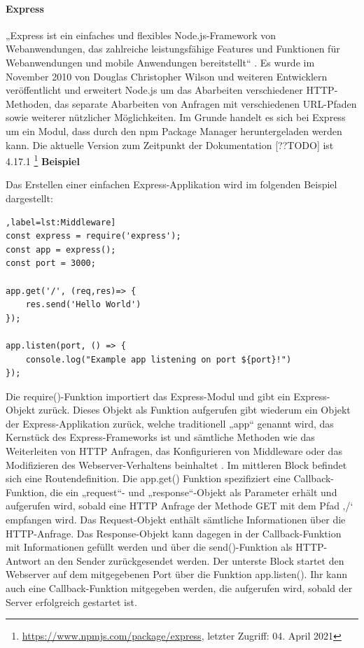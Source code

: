 \paragraph{Express}
„Express ist ein einfaches und flexibles Node.js-Framework von Webanwendungen, das zahlreiche leistungsfähige Features und Funktionen für Webanwendungen und mobile Anwendungen bereitstellt“ \cite{Node1.6}.  Es wurde im November 2010 von Douglas Christopher Wilson und weiteren Entwicklern veröffentlicht und erweitert Node.js um das Abarbeiten verschiedener HTTP-Methoden, das separate Abarbeiten von Anfragen mit verschiedenen URL-Pfaden sowie weiterer nützlicher Möglichkeiten. Im Grunde handelt es sich bei Express um ein Modul, dass durch den npm Package Manager heruntergeladen werden kann. Die aktuelle Version zum Zeitpunkt der Dokumentation [??TODO] ist 4.17.1 \footnote{\url{https://www.npmjs.com/package/express}, letzter Zugriff: 04. April 2021}
\newline
\newline
\textbf{Beispiel}
\newline

\noindent
Das Erstellen einer einfachen Express-Applikation wird im folgenden Beispiel dargestellt:\newline

\begin{lstlisting}[caption=Einfacher Webserver [nodejs 1.8],label=lst:Middleware]
const express = require('express');
const app = express();
const port = 3000;

app.get('/', (req,res)=> {
	res.send('Hello World')
});

app.listen(port, () => {
	console.log("Example app listening on port ${port}!")
});
\end{lstlisting}

\noindent
Die require()-Funktion importiert das Express-Modul und gibt ein Express-Objekt zurück. 
Dieses Objekt als Funktion aufgerufen gibt wiederum ein Objekt der Express-Applikation zurück, welche traditionell „app“ genannt wird, das Kernstück des Express-Frameworks ist und sämtliche Methoden wie das Weiterleiten von HTTP Anfragen, das Konfigurieren von Middleware oder das Modifizieren des Webserver-Verhaltens beinhaltet \cite{Node1.8}.
\newline
\noindent
Im mittleren Block befindet sich eine Routendefinition. Die app.get() Funktion spezifiziert eine Callback-Funktion, die ein „request“- und „response“-Objekt als Parameter erhält und aufgerufen wird, sobald eine HTTP Anfrage der Methode GET mit dem Pfad ‚/‘ empfangen wird. Das Request-Objekt enthält sämtliche Informationen über die HTTP-Anfrage. Das Response-Objekt kann dagegen in der Callback-Funktion mit Informationen gefüllt werden und über die send()-Funktion als HTTP-Antwort an den Sender zurückgesendet werden.
\newline
\noindent
Der unterste Block startet den Webserver auf dem mitgegebenen Port über die Funktion app.listen(). Ihr kann auch eine Callback-Funktion mitgegeben werden, die aufgerufen wird, sobald der Server erfolgreich gestartet ist.
\newpage

